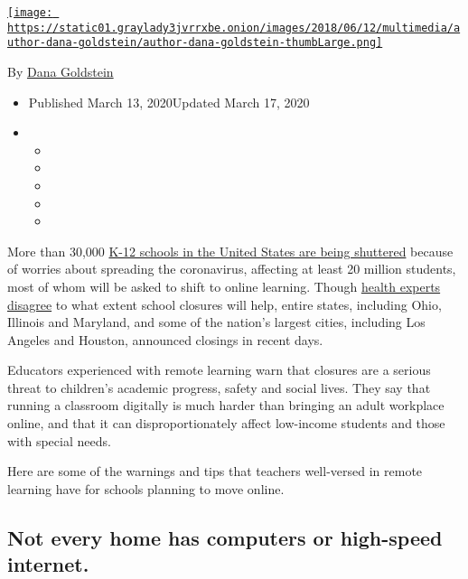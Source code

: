 \href{https://www.nytimes3xbfgragh.onion/by/dana-goldstein}{\texttt{[image: https://static01.graylady3jvrrxbe.onion/images/2018/06/12/multimedia/author-dana-goldstein/author-dana-goldstein-thumbLarge.png]}}

By \href{https://www.nytimes3xbfgragh.onion/by/dana-goldstein}{Dana
Goldstein}

\begin{itemize}
\item
  Published March 13, 2020Updated March 17, 2020
\item
  \begin{itemize}
  \item
  \item
  \item
  \item
  \item
  \end{itemize}
\end{itemize}

More than 30,000
\href{https://www.edweek.org/ew/section/multimedia/map-coronavirus-and-school-closures.html}{K-12
schools in the United States are being shuttered} because of worries
about spreading the coronavirus, affecting at least 20 million students,
most of whom will be asked to shift to online learning. Though
\href{https://www.nytimes3xbfgragh.onion/2020/03/10/opinion/coronavirus-school-closing.html}{health
experts disagree} to what extent school closures will help, entire
states, including Ohio, Illinois and Maryland, and some of the nation's
largest cities, including Los Angeles and Houston, announced closings in
recent days.

Educators experienced with remote learning warn that closures are a
serious threat to children's academic progress, safety and social lives.
They say that running a classroom digitally is much harder than bringing
an adult workplace online, and that it can disproportionately affect
low-income students and those with special needs.

Here are some of the warnings and tips that teachers well-versed in
remote learning have for schools planning to move online.

\hypertarget{not-every-home-has-computers-or-high-speed-internet}{%
\subsection{Not every home has computers or high-speed
internet.}\label{not-every-home-has-computers-or-high-speed-internet}}

